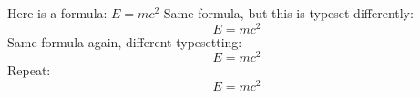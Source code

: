 \documentclass {article}
\begin{document}
Here is a formula: $E = mc^{2}$
Same formula, but this is typeset differently: \[ E = mc^{2} \]
Same formula again, different typesetting:
\begin{equation}
E = mc^{2}
\end{equation}
Repeat:
\begin{equation}
E = mc^{2}
\end{equation}
\end{document}
